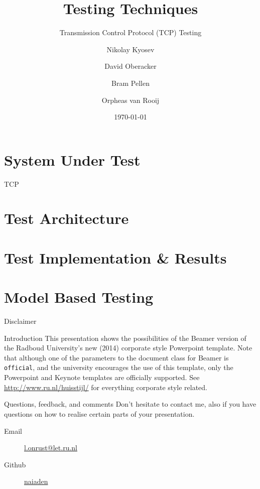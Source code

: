 \documentclass[showdate=true, slidenumbers=relative]{beamerruhuisstijl169}
\title{Testing Techniques}
\subtitle{Transmission Control Protocol (TCP) Testing}
\date{\today}
\author{Nikolay Kyosev \and David Oberacker \and Bram Pellen \and Orpheas van Rooij}
\begin{document}
\begin{frame}
    \maketitle
\end{frame}

\begin{frame}
    \tableofcontents
\end{frame}

\section{System Under Test}

\begin{frame}{TCP}
    
\end{frame}

\section{Test Architecture}

\section{Test Implementation \& Results}

\section{Model Based Testing}

\appendix

\begin{frame}{Disclaimer}
    \begin{block}{Introduction}
        This presentation shows the possibilities of the Beamer version of the Radboud University's new (2014) corporate style Powerpoint template. Note that although one of the parameters to the document class for Beamer is \texttt{official}, and the university encourages the use of this template, only the Powerpoint and Keynote templates are officially supported. See \url{http://www.ru.nl/huisstijl/} for everything corporate style related.
    \end{block}

    \begin{block}{Questions, feedback, and comments}
        Don't hesitate to contact me, also if you have questions on how to realise certain parts of your presentation.
        \begin{description}
            \item[Email] \href{mailto:l.onrust@let.ru.nl}{l.onrust@let.ru.nl}
            \item[Github] \href{https://github.com/naiaden}{naiaden}
        \end{description}
    \end{block}
\end{frame}
\end{document}
